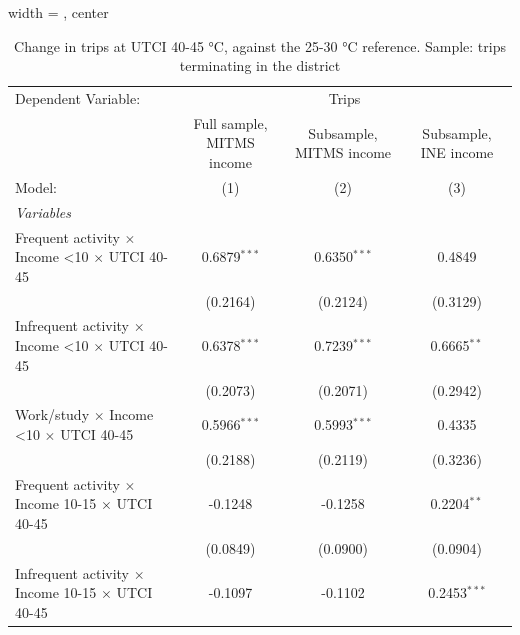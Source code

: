 
\begin{table}[htbp]
   \caption{\label{table_models_abc_terminating_40-45} Change in trips at UTCI 40-45 °C, against the 25-30 °C reference. Sample: trips terminating in the district}
   \centering
   \small
   \begin{adjustbox}{width = \textwidth, center}
      \begin{tabular}{lccc}
         \tabularnewline \midrule \midrule
         Dependent Variable: & \multicolumn{3}{c}{Trips}\\
                                                                         & Full sample, MITMS income & Subsample, MITMS income & Subsample, INE income \\   
         Model:                                                          & (1)                       & (2)                     & (3)\\  
         \midrule
         \emph{Variables}\\
         Frequent activity $\times$ Income <10 $\times$ UTCI 40-45       & 0.6879$^{***}$            & 0.6350$^{***}$          & 0.4849\\   
                                                                         & (0.2164)                  & (0.2124)                & (0.3129)\\   
         Infrequent activity $\times$ Income <10 $\times$ UTCI 40-45     & 0.6378$^{***}$            & 0.7239$^{***}$          & 0.6665$^{**}$\\   
                                                                         & (0.2073)                  & (0.2071)                & (0.2942)\\   
         Work/study $\times$ Income <10 $\times$ UTCI 40-45              & 0.5966$^{***}$            & 0.5993$^{***}$          & 0.4335\\   
                                                                         & (0.2188)                  & (0.2119)                & (0.3236)\\   
         Frequent activity $\times$ Income 10-15 $\times$ UTCI 40-45     & -0.1248                   & -0.1258                 & 0.2204$^{**}$\\   
                                                                         & (0.0849)                  & (0.0900)                & (0.0904)\\   
         Infrequent activity $\times$ Income 10-15 $\times$ UTCI 40-45   & -0.1097                   & -0.1102                 & 0.2453$^{***}$\\   

\end{tabular}
\end{adjustbox}
\end{table}
